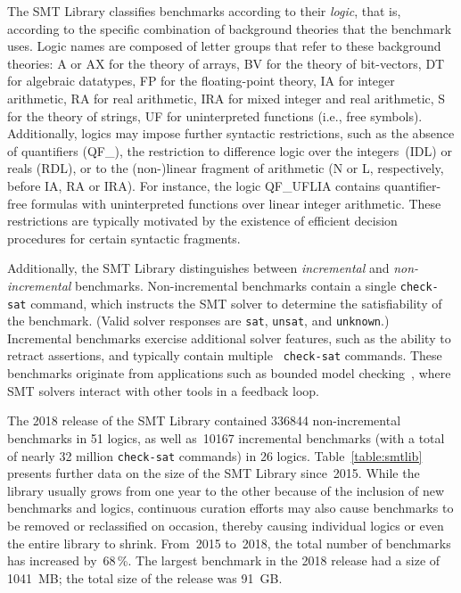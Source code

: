 \documentclass[dvipsnames,table,twoside,11pt]{article}
\begin{document}
The SMT Library classifies benchmarks according to their \emph{logic},
that is, according to the specific combination of background theories
that the benchmark uses.  Logic names are composed of letter groups
that refer to these background theories: {A} or {AX} for the theory of
arrays, {BV} for the theory of bit-vectors, {DT} for algebraic
datatypes, {FP} for the floating-point theory, {IA} for integer
arithmetic, {RA} for real arithmetic, {IRA} for mixed integer and real
arithmetic, {S} for the theory of strings, {UF} for uninterpreted
functions (i.e., free symbols).  Additionally, logics may impose
further syntactic restrictions, such as the absence of quantifiers
({QF\_}), the restriction to difference logic over the
integers~({IDL}) or reals ({RDL}), or to the (non-)linear fragment of
arithmetic ({N} or {L}, respectively, before {IA}, {RA} or {IRA}).
For instance, the logic QF\_UFLIA contains quantifier-free formulas
with uninterpreted functions over linear integer arithmetic.  These
restrictions are typically motivated by the existence of efficient
decision procedures for certain syntactic fragments.

Additionally, the SMT Library distinguishes between \emph{incremental}
and \emph{non-incremental} benchmarks.  Non-incremental benchmarks
contain a single {\tt check-sat} command, which instructs the SMT
solver to determine the satisfiability of the benchmark.  (Valid
solver responses are {\tt sat}, {\tt unsat}, and {\tt unknown}.)
Incremental benchmarks exercise additional solver features, such as
the ability to retract assertions, and typically contain multiple {\tt
  check-sat} commands.  These benchmarks originate from applications
such as bounded model
checking~\cite{Gunther:2014:IBS:2632362.2632374}, where SMT solvers
interact with other tools in a feedback loop.

The 2018 release of the SMT Library contained \num{336844} non-incremental
benchmarks in 51 logics, as well as~\num{10167} incremental benchmarks
(with a total of nearly 32 million {\tt check-sat} commands) in 26
logics.  Table~\ref{table:smtlib} presents further data on the size of
the SMT Library since~2015.  While the library usually grows from one
year to the other because of the inclusion of new benchmarks and
logics, continuous curation efforts may also cause benchmarks to be
removed or reclassified on occasion, thereby causing individual logics
or even the entire library to shrink.  From~2015 to~2018, the total
number of benchmarks has increased by~68\,\%.  The largest benchmark
in the 2018 release had a size of \num{1041}~MB; the total size of the
release was 91~GB.
\end{document}
